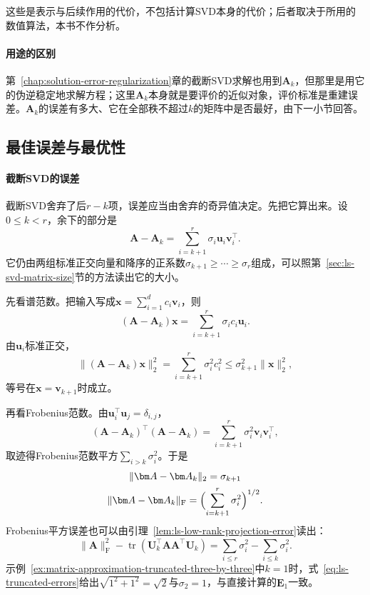 这些是表示与后续作用的代价，不包括计算SVD本身的代价；后者取决于所用的数值算法，本书不作分析。

\paragraph{用途的区别}
第~\ref{chap:solution-error-regularization}章的截断SVD求解也用到$\bm A_k$，但那里是用它的伪逆稳定地求解方程；这里$\bm A_k$本身就是要评价的近似对象，评价标准是重建误差。$\bm A_k$的误差有多大、它在全部秩不超过$k$的矩阵中是否最好，由下一小节回答。

\subsection{最佳误差与最优性}
\label{sec:ls-truncated-svd-optimality}

\paragraph{截断SVD的误差}
截断SVD舍弃了后$r-k$项，误差应当由舍弃的奇异值决定。先把它算出来。设$0\leq k<r$，余下的部分是
\[
 \bm A-\bm A_k=\sum_{i=k+1}^r\sigma_i\bm u_i\bm v_i^\top .
\]
它仍由两组标准正交向量和降序的正系数$\sigma_{k+1}\geq\cdots\geq\sigma_r$组成，可以照第~\ref{sec:ls-svd-matrix-size}节的方法读出它的大小。

先看谱范数。把输入写成$\bm x=\sum_{i=1}^dc_i\bm v_i$，则
\[
 (\bm A-\bm A_k)\bm x=\sum_{i=k+1}^r\sigma_ic_i\bm u_i .
\]
由$\bm u_i$标准正交，
\[
 \lVert(\bm A-\bm A_k)\bm x\rVert_2^2=\sum_{i=k+1}^r\sigma_i^2c_i^2\leq\sigma_{k+1}^2\lVert\bm x\rVert_2^2,
\]
等号在$\bm x=\bm v_{k+1}$时成立。

再看Frobenius范数。由$\bm u_i^\top\bm u_j=\delta_{i,j}$，
\[
 (\bm A-\bm A_k)^\top(\bm A-\bm A_k)=\sum_{i=k+1}^r\sigma_i^2\bm v_i\bm v_i^\top ,
\]
取迹得Frobenius范数平方$\sum_{i>k}\sigma_i^2$。于是
\begin{equation}
\begin{gathered}
\lVert\bm A-\bm A_k\rVert_2=\sigma_{k+1}\\
\lVert\bm A-\bm A_k\rVert_{\mathrm F}
 =\Bigl(\sum_{i=k+1}^r\sigma_i^2\Bigr)^{1/2}.
\end{gathered}
\label{eq:ls-truncated-errors}
\end{equation}
Frobenius平方误差也可以由引理~\ref{lem:ls-low-rank-projection-error}读出：
\[
 \lVert\bm A\rVert_{\mathrm F}^2-\operatorname{tr}(\bm U_k^\top\bm A\bm A^\top\bm U_k)=\sum_{i\leq r}\sigma_i^2-\sum_{i\leq k}\sigma_i^2 .
\]
示例~\ref{ex:matrix-approximation-truncated-three-by-three}中$k=1$时，式~\eqref{eq:ls-truncated-errors}给出$\sqrt{1^2+1^2}=\sqrt2$与$\sigma_2=1$，与直接计算的$\bm E_1$一致。

